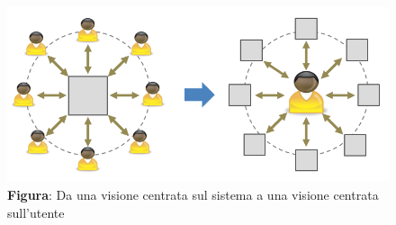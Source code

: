     \begin{figure}[H]
        \centering
        \includegraphics[scale=0.5]{assets/immagini varie/target utenti.png}
        \caption*{\textbf{Figura}: Da una visione centrata sul sistema a una visione centrata sull’utente}\label{fig:target_utenti}
    \end{figure}